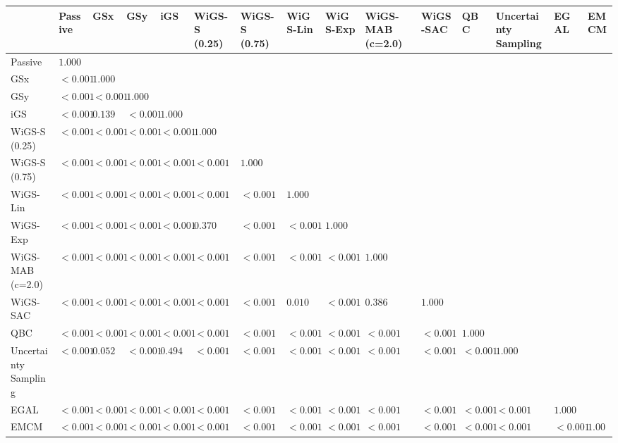 \begin{tabular}{lllllllllllllll}
\toprule
 & Passive & GSx & GSy & iGS & WiGS-S (0.25) & WiGS-S (0.75) & WiGS-Lin & WiGS-Exp & WiGS-MAB (c=2.0) & WiGS-SAC & QBC & Uncertainty Sampling & EGAL & EMCM \\
\midrule
Passive & $1.000$ &  &  &  &  &  &  &  &  &  &  &  &  &  \\
GSx & $<0.001$ & $1.000$ &  &  &  &  &  &  &  &  &  &  &  &  \\
GSy & $<0.001$ & $<0.001$ & $1.000$ &  &  &  &  &  &  &  &  &  &  &  \\
iGS & $<0.001$ & $0.139$ & $<0.001$ & $1.000$ &  &  &  &  &  &  &  &  &  &  \\
WiGS-S (0.25) & $<0.001$ & $<0.001$ & $<0.001$ & $<0.001$ & $1.000$ &  &  &  &  &  &  &  &  &  \\
WiGS-S (0.75) & $<0.001$ & $<0.001$ & $<0.001$ & $<0.001$ & $<0.001$ & $1.000$ &  &  &  &  &  &  &  &  \\
WiGS-Lin & $<0.001$ & $<0.001$ & $<0.001$ & $<0.001$ & $<0.001$ & $<0.001$ & $1.000$ &  &  &  &  &  &  &  \\
WiGS-Exp & $<0.001$ & $<0.001$ & $<0.001$ & $<0.001$ & $0.370$ & $<0.001$ & $<0.001$ & $1.000$ &  &  &  &  &  &  \\
WiGS-MAB (c=2.0) & $<0.001$ & $<0.001$ & $<0.001$ & $<0.001$ & $<0.001$ & $<0.001$ & $<0.001$ & $<0.001$ & $1.000$ &  &  &  &  &  \\
WiGS-SAC & $<0.001$ & $<0.001$ & $<0.001$ & $<0.001$ & $<0.001$ & $<0.001$ & $0.010$ & $<0.001$ & $0.386$ & $1.000$ &  &  &  &  \\
QBC & $<0.001$ & $<0.001$ & $<0.001$ & $<0.001$ & $<0.001$ & $<0.001$ & $<0.001$ & $<0.001$ & $<0.001$ & $<0.001$ & $1.000$ &  &  &  \\
Uncertainty Sampling & $<0.001$ & $0.052$ & $<0.001$ & $0.494$ & $<0.001$ & $<0.001$ & $<0.001$ & $<0.001$ & $<0.001$ & $<0.001$ & $<0.001$ & $1.000$ &  &  \\
EGAL & $<0.001$ & $<0.001$ & $<0.001$ & $<0.001$ & $<0.001$ & $<0.001$ & $<0.001$ & $<0.001$ & $<0.001$ & $<0.001$ & $<0.001$ & $<0.001$ & $1.000$ &  \\
EMCM & $<0.001$ & $<0.001$ & $<0.001$ & $<0.001$ & $<0.001$ & $<0.001$ & $<0.001$ & $<0.001$ & $<0.001$ & $<0.001$ & $<0.001$ & $<0.001$ & $<0.001$ & $1.000$ \\
\bottomrule
\end{tabular}
